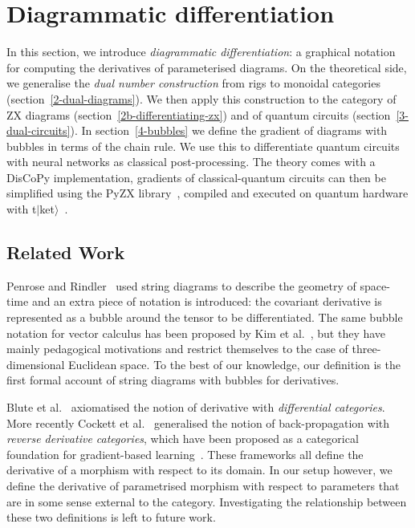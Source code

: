 
\section{Diagrammatic differentiation}\label{section:diag-diff}

In this section, we introduce \emph{diagrammatic differentiation}: a graphical notation for computing the derivatives of parameterised diagrams.
On the theoretical side, we generalise the \emph{dual number construction} from rigs to monoidal categories (section~\ref{2-dual-diagrams}).
We then apply this construction to the category of ZX diagrams (section~\ref{2b-differentiating-zx}) and of quantum circuits (section~\ref{3-dual-circuits}).
In section~\ref{4-bubbles} we define the gradient of diagrams with bubbles in terms of the chain rule.
We use this to differentiate quantum circuits with neural networks as classical post-processing.
The theory comes with a DisCoPy implementation, gradients of classical-quantum circuits can then
be simplified using the PyZX library~\cite{KissingerVanDeWetering19}, compiled and executed
on quantum hardware with t$\vert$ket$\rangle$~\cite{SivarajahEtAl20}.

\subsection*{Related Work}

Penrose and Rindler~\cite{PenroseRindler84} used string diagrams to describe the geometry of space-time and an extra piece of notation is introduced: the covariant derivative is represented as a bubble around the tensor to be differentiated.
The same bubble notation for vector calculus has been proposed by Kim et al.~\cite{KimEtAl20}, but they have mainly pedagogical motivations and restrict themselves to the case of three-dimensional Euclidean space.
To the best of our knowledge, our definition is the first formal account of string diagrams with bubbles for derivatives.

Blute et al.~\cite{BluteEtAl06} axiomatised the notion of derivative with \emph{differential categories}.
More recently Cockett et al.~\cite{CockettEtAl19} generalised the notion of back-propagation with \emph{reverse derivative categories}, which have been proposed as a categorical foundation for gradient-based learning~\cite{CruttwellEtAl21}.
These frameworks all define the derivative of a morphism with respect to its domain.
In our setup however, we define the derivative of parametrised morphism with respect to parameters that are in some sense external to the category.
Investigating the relationship between these two definitions is left to future work.

